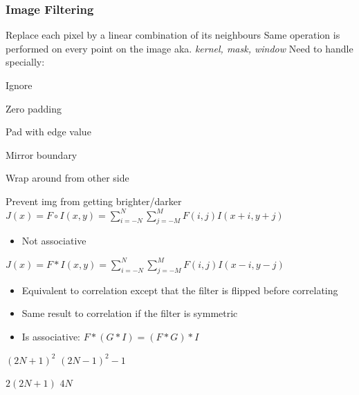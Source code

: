 \subsubsection{Image Filtering}
\begin{itemize}
     Replace each pixel by a linear combination of its neighbours
     Same operation is performed on every point on the image
     aka. \textit{kernel, mask, window}
     Need to handle specially:
        \begin{itemize*}
            \item Ignore
            \item Zero padding
            \item Pad with edge value
            \item Mirror boundary
            \item Wrap around from other side
        \end{itemize*}
     Prevent img from getting brighter/darker
     $J(x) = F \circ I(x,y) = \sum_{i=-N}^N \sum_{j=-M}^M F(i,j) I(x + i, y + j)$
        \begin{itemize}
            \item Not associative
        \end{itemize}
     $J(x) = F \ast I(x,y) = \sum_{i=-N}^N \sum_{j=-M}^M F(i,j) I(x - i, y - j)$
        \begin{itemize}
            \item Equivalent to correlation except that the filter is flipped before correlating
            \item Same result to correlation if the filter is symmetric
            \item Is associative: $F \ast (G \ast I) = (F \ast G) \ast I$
        \end{itemize}
        \begin{itemize}
                \begin{itemize*}
                     $(2N + 1)^2$
                     $(2N - 1)^2 - 1$
                \end{itemize*}
                \begin{itemize*}
                     $2(2N + 1)$
                     $4N$
                \end{itemize*}

\end{itemize}
\end{itemize}
